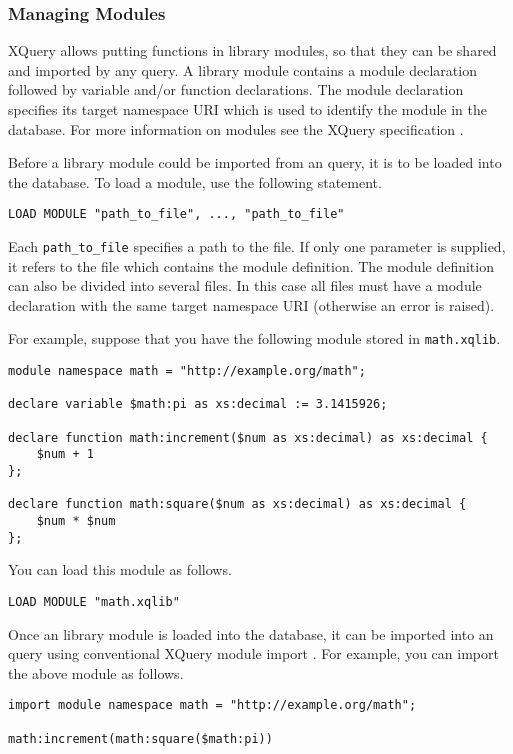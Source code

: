 \documentclass[a4paper,12pt]{article}
\begin{document}
\subsubsection{Managing Modules}
XQuery allows putting functions in library modules, so that they can be shared and imported by any query.
A library module contains a module declaration followed by variable and/or function declarations. The module declaration specifies its target namespace URI which is used to identify the module in the database. For more information on modules see the XQuery specification \cite{paper:query-language}.

Before a library module could be imported from an query, it is to be loaded into the database. To load a module, use the following statement.

\begin{verbatim}
LOAD MODULE "path_to_file", ..., "path_to_file"
\end{verbatim}

Each \verb!path_to_file! specifies a path to the file. If only one parameter is supplied, it refers to the file which contains the module definition. The module definition can also be divided into several files. In this case all files must have a module declaration with the same target namespace URI (otherwise an error is raised).

For example, suppose that you have the following module stored in \verb!math.xqlib!.

\begin{verbatim}
module namespace math = "http://example.org/math";

declare variable $math:pi as xs:decimal := 3.1415926;

declare function math:increment($num as xs:decimal) as xs:decimal {
    $num + 1
};

declare function math:square($num as xs:decimal) as xs:decimal {
    $num * $num
};
\end{verbatim}

You can load this module as follows.

\begin{verbatim}
LOAD MODULE "math.xqlib"
\end{verbatim}

Once an library module is loaded into the database, it can be imported into an query using conventional XQuery module import \cite{paper:query-language}. For example, you can import the above module as follows.

\begin{verbatim}
import module namespace math = "http://example.org/math";

math:increment(math:square($math:pi))

\end{verbatim}
\end{document}
